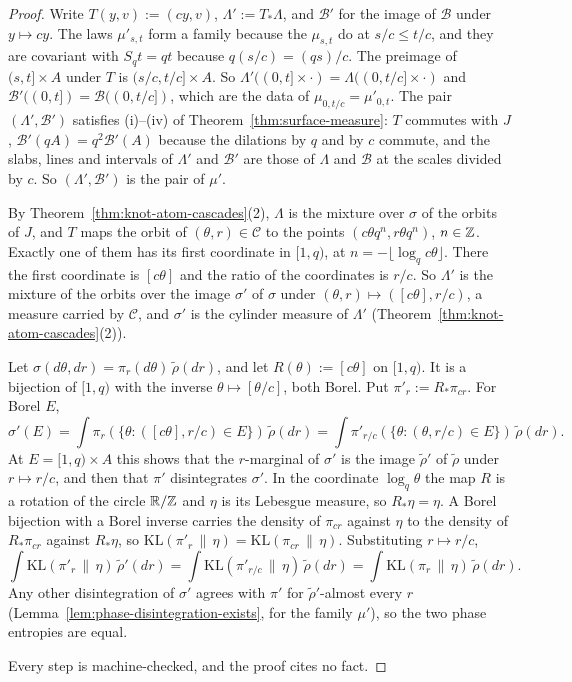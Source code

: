 \begin{proof}
Write $T(y, v) := (cy, v)$, $\Lambda' := T_*\Lambda$, and $\mathcal{B}'$ for the image of
$\mathcal{B}$ under $y \mapsto cy$. The laws $\mu'_{s,t}$ form a family because the $\mu_{s,t}$ do
at $s/c \le t/c$, and they are covariant with $S_qt = qt$ because $q(s/c) = (qs)/c$. The preimage
of $(s,t] \times A$ under $T$ is $(s/c, t/c] \times A$. So
$\Lambda'((0,t] \times \cdot) = \Lambda((0,t/c] \times \cdot)$ and
$\mathcal{B}'((0,t]) = \mathcal{B}((0,t/c])$, which are the data of $\mu_{0,t/c} = \mu'_{0,t}$.
The pair $(\Lambda', \mathcal{B}')$ satisfies (i)--(iv) of Theorem~\ref{thm:surface-measure}:
$T$ commutes with $J$, $\mathcal{B}'(qA) = q^2\mathcal{B}'(A)$ because the dilations by $q$ and
by $c$ commute, and
the slabs, lines and intervals of $\Lambda'$ and $\mathcal{B}'$ are those of $\Lambda$ and
$\mathcal{B}$ at the scales divided by $c$. So $(\Lambda', \mathcal{B}')$ is the pair of $\mu'$.

By Theorem~\ref{thm:knot-atom-cascades}(2), $\Lambda$ is the mixture over $\sigma$ of the orbits
of $J$, and $T$ maps the orbit of $(\theta, r) \in \mathcal{C}$ to the points
$(c\theta q^n, r\theta q^n)$, $n \in \mathbb{Z}$. Exactly one of them has its first coordinate in
$[1,q)$, at $n = -\lfloor\log_q c\theta\rfloor$. There the first coordinate is $[c\theta]$ and the
ratio of the coordinates is $r/c$. So $\Lambda'$ is the mixture of the orbits over the image
$\sigma'$ of $\sigma$ under $(\theta, r) \mapsto ([c\theta], r/c)$, a measure carried by
$\mathcal{C}$, and $\sigma'$ is the cylinder measure of $\Lambda'$
(Theorem~\ref{thm:knot-atom-cascades}(2)).

Let $\sigma(d\theta, dr) = \pi_r(d\theta)\,\tilde\rho(dr)$, and let $R(\theta) := [c\theta]$ on
$[1,q)$. It is a bijection of $[1,q)$ with the inverse $\theta \mapsto [\theta/c]$, both Borel.
Put $\pi'_r := R_*\pi_{cr}$. For Borel $E$,
\[
  \sigma'(E) = \int\pi_r(\{\theta : ([c\theta], r/c) \in E\})\,\tilde\rho(dr)
  = \int\pi'_{r/c}(\{\theta : (\theta, r/c) \in E\})\,\tilde\rho(dr).
\]
At $E = [1,q) \times A$ this shows that the $r$-marginal of $\sigma'$ is the image $\tilde\rho'$
of $\tilde\rho$ under $r \mapsto r/c$, and then that $\pi'$ disintegrates $\sigma'$. In the
coordinate $\log_q\theta$ the map $R$ is a rotation of the circle $\mathbb{R}/\mathbb{Z}$ and $\eta$ is its
Lebesgue measure, so $R_*\eta = \eta$. A Borel bijection with a Borel inverse carries the density
of $\pi_{cr}$ against $\eta$ to the density of $R_*\pi_{cr}$ against $R_*\eta$, so
$\mathrm{KL}(\pi'_r \,\|\, \eta) = \mathrm{KL}(\pi_{cr} \,\|\, \eta)$. Substituting $r \mapsto r/c$,
\[
  \int\mathrm{KL}(\pi'_r \,\|\, \eta)\,\tilde\rho'(dr)
  = \int\mathrm{KL}(\pi'_{r/c} \,\|\, \eta)\,\tilde\rho(dr)
  = \int\mathrm{KL}(\pi_r \,\|\, \eta)\,\tilde\rho(dr).
\]
Any other disintegration of $\sigma'$ agrees with $\pi'$ for $\tilde\rho'$-almost every $r$
(Lemma~\ref{lem:phase-disintegration-exists}, for the family $\mu'$), so the two phase entropies
are equal.

Every step is machine-checked, and the proof cites no fact.
\end{proof}

